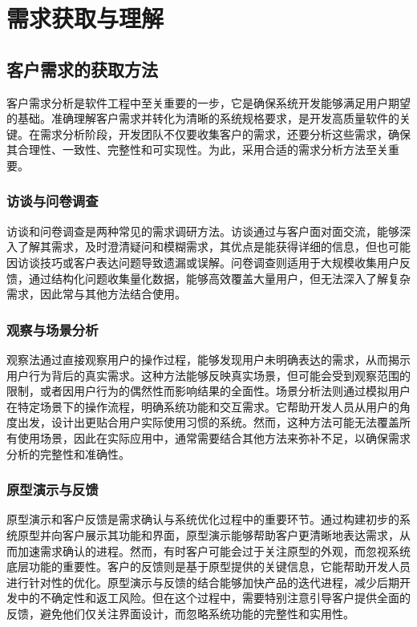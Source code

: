 \section{需求获取与理解}

\subsection{客户需求的获取方法}

客户需求分析是软件工程中至关重要的一步，它是确保系统开发能够满足用户期望的基础。准确理解客户需求并转化为清晰的系统规格要求，是开发高质量软件的关键。在需求分析阶段，开发团队不仅要收集客户的需求，还要分析这些需求，确保其合理性、一致性、完整性和可实现性。为此，采用合适的需求分析方法至关重要。

\subsubsection{访谈与问卷调查}

访谈和问卷调查是两种常见的需求调研方法。访谈通过与客户面对面交流，能够深入了解其需求，及时澄清疑问和模糊需求，其优点是能获得详细的信息，但也可能因访谈技巧或客户表达问题导致遗漏或误解。问卷调查则适用于大规模收集用户反馈，通过结构化问题收集量化数据，能够高效覆盖大量用户，但无法深入了解复杂需求，因此常与其他方法结合使用。

\subsubsection{观察与场景分析}

观察法通过直接观察用户的操作过程，能够发现用户未明确表达的需求，从而揭示用户行为背后的真实需求。这种方法能够反映真实场景，但可能会受到观察范围的限制，或者因用户行为的偶然性而影响结果的全面性。场景分析法则通过模拟用户在特定场景下的操作流程，明确系统功能和交互需求。它帮助开发人员从用户的角度出发，设计出更贴合用户实际使用习惯的系统。然而，这种方法可能无法覆盖所有使用场景，因此在实际应用中，通常需要结合其他方法来弥补不足，以确保需求分析的完整性和准确性。

\subsubsection{原型演示与反馈}

原型演示和客户反馈是需求确认与系统优化过程中的重要环节。通过构建初步的系统原型并向客户展示其功能和界面，原型演示能够帮助客户更清晰地表达需求，从而加速需求确认的进程。然而，有时客户可能会过于关注原型的外观，而忽视系统底层功能的重要性。客户的反馈则是基于原型提供的关键信息，它能帮助开发人员进行针对性的优化。原型演示与反馈的结合能够加快产品的迭代进程，减少后期开发中的不确定性和返工风险。但在这个过程中，需要特别注意引导客户提供全面的反馈，避免他们仅关注界面设计，而忽略系统功能的完整性和实用性。

